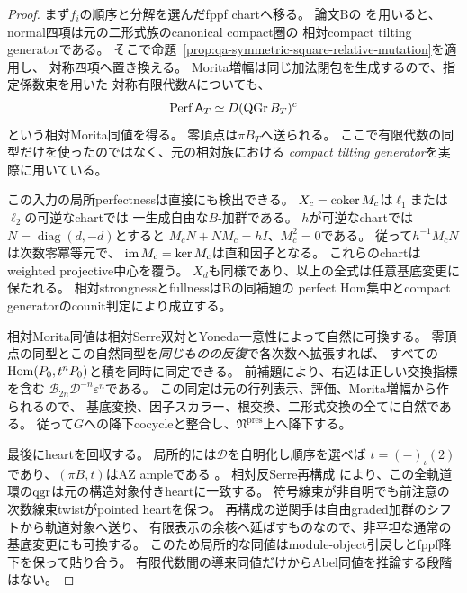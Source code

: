 \begin{proof}
まず$f_i$の順序と分解を選んだfppf chartへ移る。
論文Bの\cite[\texttt{lem:nc-relative-normal-tilting}]{QuadricModuli2026}
を用いると、normal四項は元の二形式族のcanonical compact圏の
相対compact tilting generatorである。
そこで命題~\ref{prop:qa-symmetric-square-relative-mutation}を適用し、
対称四項へ置き換える。
Morita増幅は同じ加法閉包を生成するので、指定係数束を用いた
対称有限代数$\mathsf A$についても、
\[
 \operatorname{Perf}\mathsf A_T\simeq D(\operatorname{QGr}B_T)^c
\]
という相対Morita同値を得る。
零頂点は$\pi B_T$へ送られる。
ここで有限代数の同型だけを使ったのではなく、元の相対族における
\emph{compact tilting generator}を実際に用いている。

この入力の局所perfectnessは直接にも検出できる。
$X_c=\operatorname{coker} M_c$は$\ell_1$または$\ell_2$の可逆なchartでは
一生成自由な$B$-加群である。
$h$が可逆なchartでは$N=\operatorname{diag}(d,-d)$とすると
$M_cN+NM_c=hI$、$M_c^2=0$である。
従って$h^{-1}M_cN$は次数零冪等元で、
$\operatorname{im} M_c=\ker M_c$は直和因子となる。
これらのchartはweighted projective中心を覆う。
$X_d$も同様であり、以上の全式は任意基底変更に保たれる。
相対strongnessとfullnessはBの同補題の
perfect Hom集中とcompact generatorのcounit判定により成立する。

相対Morita同値は相対Serre双対とYoneda一意性によって自然に可換する。
零頂点の同型とこの自然同型を\emph{同じものの反復}で各次数へ拡張すれば、
すべての$\operatorname{Hom}(P_0,t^nP_0)$と積を同時に同定できる。
前補題により、右辺は正しい交換指標を含む
$\mathcal B_{2n}\mathcal D^{-n}\varepsilon^n$である。
この同定は元の行列表示、評価、Morita増幅から作られるので、
基底変換、因子スカラー、根交換、二形式交換の全てに自然である。
従って$G$への降下cocycleと整合し、$\mathfrak N^{\mathrm{pres}}$上へ降下する。

最後にheartを回収する。
局所的には$\mathcal D$を自明化し順序を選べば
$t=(-)_\iota(2)$であり、$(\pi B,t)$はAZ ampleである
\cite[\texttt{prop:nc-root-ample-orbit}]{QuadricModuli2026}。
相対反Serre再構成
\cite[\texttt{prop:relative-h2-antiserre-reconstruction}]{QuadricModuli2026}
により、この全軌道環の$\operatorname{qgr}$は元の構造対象付きheartに一致する。
符号線束が非自明でも前注意の次数線束twistがpointed heartを保つ。
再構成の逆関手は自由graded加群のシフトから軌道対象へ送り、
有限表示の余核へ延ばすものなので、非平坦な通常の基底変更にも可換する。
このため局所的な同値はmodule-object引戻しとfppf降下を保って貼り合う。
有限代数間の導来同値だけからAbel同値を推論する段階はない。
\end{proof}

